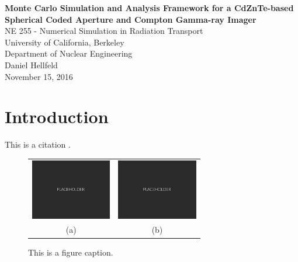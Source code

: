 \documentclass[10pt]{article}
\begin{document}
\begin{centering}
\textbf{Monte Carlo Simulation and Analysis Framework for a CdZnTe-based Spherical Coded Aperture and Compton Gamma-ray Imager}\\
\vspace{11pt}
NE 255 - Numerical Simulation in Radiation Transport\\
University of California, Berkeley\\
Department of Nuclear Engineering\\
\vspace{11pt}
Daniel Hellfeld\\
\vspace{11pt}
November 15, 2016 \\
\end{centering}


\section{Introduction}

\lipsum[1] 

\vspace{10pt}
This is a citation \cite{Agostinelli2003}.


\begin{figure}[htb]
\hypertarget{fig1}{}
\centering
\begin{tabular}{cc}
	\includegraphics[width=100pt]{Figures/Placeholder.png} & 
	\includegraphics[width=100pt]{Figures/Placeholder.png} \\
	\scriptsize{(a)} & \scriptsize{(b)}
\end{tabular}
\caption{This is a figure caption.}
\end{figure}






\end{document}
